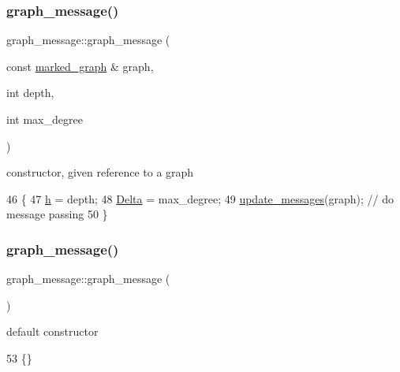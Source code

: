\subsubsection{\texorpdfstring{graph\+\_\+message()}{graph\_message()}\hspace{0.1cm}{\footnotesize\ttfamily [1/2]}}
{\footnotesize\ttfamily graph\+\_\+message\+::graph\+\_\+message (\begin{DoxyParamCaption}\item[{const \hyperlink{classmarked__graph}{marked\+\_\+graph} \&}]{graph,  }\item[{int}]{depth,  }\item[{int}]{max\+\_\+degree }\end{DoxyParamCaption})\hspace{0.3cm}{\ttfamily [inline]}}



constructor, given reference to a graph 


\begin{DoxyCode}
46                                                                      \{
47     \hyperlink{classgraph__message_a934d63ed7275c211e13c6fb68824ed46}{h} = depth;
48     \hyperlink{classgraph__message_a45dfd061b7bc73572e5132fbf66efd55}{Delta} = max\_degree;
49     \hyperlink{classgraph__message_a40dadc59d582b290202e79bc4a9e896c}{update\_messages}(graph); \textcolor{comment}{// do message passing}
50   \}
\end{DoxyCode}
\mbox{\label{classgraph__message_aa21140453eb0e1de98a2ddfcf2832aeb}} 
\subsubsection{\texorpdfstring{graph\+\_\+message()}{graph\_message()}\hspace{0.1cm}{\footnotesize\ttfamily [2/2]}}
{\footnotesize\ttfamily graph\+\_\+message\+::graph\+\_\+message (\begin{DoxyParamCaption}{ }\end{DoxyParamCaption})\hspace{0.3cm}{\ttfamily [inline]}}



default constructor 


\begin{DoxyCode}
53 \{\}
\end{DoxyCode}


